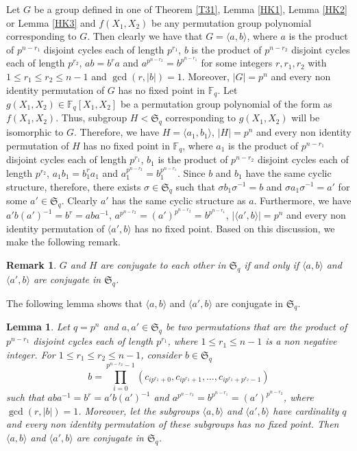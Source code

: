 \documentclass[11pt]{amsart}
\theoremstyle{plain}
\newtheorem{lem}[thm]{Lemma}
\newtheorem{rmk}[thm]{Remark}
\numberwithin{equation}{section}
\def\F{{\mathbb F}}
\begin{document}
 Let $G$ be a group defined in one of  Theorem \ref{T31}, Lemma \ref{HK1}, Lemma \ref{HK2} or Lemma \ref{HK3} and $f(X_1,X_2)$ be any permutation group polynomial corresponding to $G$. Then clearly we have that $G=\langle a,b \rangle$, where $a$ is the product of $p^{n-r_1}$ disjoint cycles each of length $p^{r_1}$, $b$ is the product of $p^{n-r_2}$ disjoint cycles each of length $p^{r_2}$, $ab=b^{r}a$ and $a^{p^{n-r_2}}=b^{p^{n-r_1}}$ for some integers $r,r_1,r_2$ with $1 \le r_1 \le r_2 \le n-1$ and $\gcd(r,|b|)=1$. Moreover, $|G|=p^n$ and every non identity permutation of $G$ has no fixed point in $\F_q$. Let $g(X_1,X_2) \in \F_q[X_1,X_2]$ be a permutation group polynomial of the form as $f(X_1,X_2)$. Thus, subgroup $H < \mathfrak{S}_q$ corresponding to $g(X_1,X_2)$ will be isomorphic to $G$.  Therefore, we have $H=\langle a_1,b_1 \rangle$, $|H|=p^n$ and every non identity permutation of $H$ has no fixed point in $\F_q$, where  $a_1$ is the product of $p^{n-r_1}$ disjoint cycles each of length $p^{r_1}$,  $b_1$ is the product of $p^{n-r_2}$ disjoint cycles each of length $p^{r_2}$, $a_1b_1=b_1^{r}a_1$ and  $a_1^{p^{n-r_2}}=b_1^{p^{n-r_1}}$. Since $b$ and $b_1$ have the same cyclic structure, therefore, there exists $\sigma \in \mathfrak{S}_q$ such that $\sigma b_1 \sigma^{-1} =b$ and $\sigma a_1 \sigma^{-1} =a'$ for some $a' \in \mathfrak{S}_q$.  Clearly $a'$ has the same cyclic structure as $a$. Furthermore,  we have $a'b(a')^{-1}=b^{r}=aba^{-1}$, $a^{p^{n-r_2}}=(a')^{p^{n-r_2}}=b^{p^{n-r_1}}$, $|\langle a',b \rangle|=p^n$ and every non identity permutation of $\langle a',b \rangle$ has no fixed point. Based on this discussion, we make the following remark. 
  \begin{rmk}\label{R'_conjugate}
 $G$ and $H$ are conjugate to each other in $\mathfrak{S}_q$ if and only if  $\langle a,b \rangle$ and $\langle a',b \rangle$  are conjugate in $\mathfrak{S}_q$.
 \end{rmk}
  The following lemma shows that $\langle a,b \rangle$ and  $\langle a',b \rangle$ are conjugate in $\mathfrak{S}_q$.
\begin{lem}\label{G_conjugate}
 Let $q=p^n$ and $a,a'\in \mathfrak{S}_q$ be two permutations that are the product of $p^{n-r_1}$ disjoint cycles each of length $p^{r_1}$, where $1 \le r_1 \le n-1$ is a non negative integer. For $1 \le r_1 \le r_2 \le n-1$, consider $b \in \mathfrak{S}_q$
 \[
 b=\displaystyle  \prod_{i=0}^{p^{n-r_2}-1}(c_{ip^{r_2}+0},c_{ip^{r_2}+1},\ldots,c_{ip^{r_2}+p^{r_2}-1})
 \] such that $aba^{-1}=b^r=a'b(a')^{-1}$ and $a^{p^{n-r_2}}=b^{p^{n-r_1}}=(a')^{p^{n-r_2}}$, where $\gcd(r,|b|)=1$. Moreover, let the subgroups $\langle a,b \rangle$ and $\langle a',b \rangle$ have cardinality $q$ and every non identity permutation of these subgroups has no fixed point. Then $\langle a,b \rangle$ and $\langle a',b \rangle$ are conjugate in $\mathfrak{S}_q$.
 \end{lem}
\end{document}
